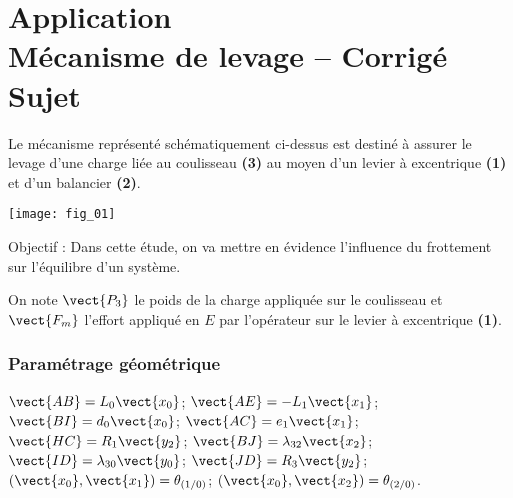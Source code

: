 \chapter*{Application  \\ 
Mécanisme de levage -- \ifprof Corrigé \else Sujet \fi}

\iflivret {} \else
\ifprof  {} \else \fi
\fi

\setcounter{question}{0}



Le mécanisme représenté schématiquement ci-dessus est destiné à assurer le levage d’une charge liée au coulisseau \textbf{(3)} au moyen d’un levier à excentrique \textbf{(1)} et d’un balancier \textbf{(2)}.

\begin{center}
\texttt{[image: fig\_01]}
\end{center}
\begin{obj}
Objectif : Dans cette étude, on va mettre en évidence l’influence du frottement sur l’équilibre d’un système.
\end{obj}

On note  $\vect{P_3}$ le poids de la charge appliquée sur le coulisseau et $\vect{F_m}$ l’effort appliqué en $E$ par l’opérateur sur le levier à excentrique \textbf{(1)}.

\subsection*{Paramétrage géométrique}
$\vect{AB}=L_0\vect{x_0}$; 
$\vect{AE}=-L_1\vect{x_1}$; 
$\vect{BI}=d_0\vect{x_0}$; 
$\vect{AC}=e_1\vect{x_1}$; 
$\vect{HC}=R_1\vect{y_2}$; 
$\vect{BJ}=\lambda_{32}\vect{x_2}$; 
$\vect{ID}=\lambda_{30}\vect{y_0}$; 
$\vect{JD}=R_3\vect{y_2}$; 
$\left(\vect{x_0},\vect{x_1} \right)=\theta_{\left(1/0\right)}$; 
$\left(\vect{x_0},\vect{x_2} \right)=\theta_{\left(2/0\right)}$.
 	 	 	 	 

